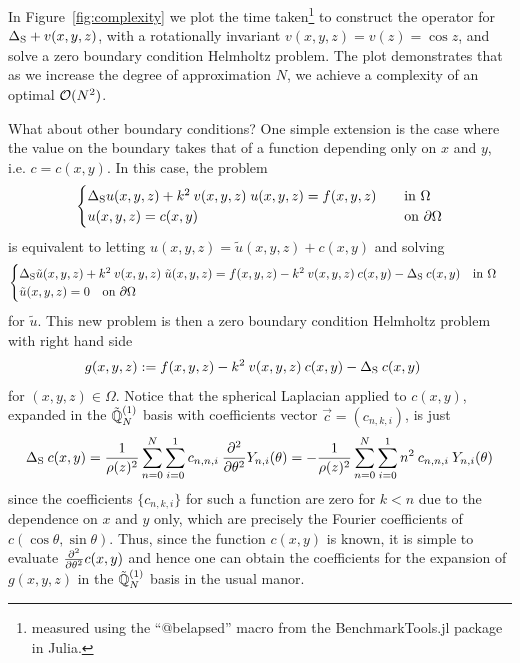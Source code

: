 \documentclass[11pt, oneside]{article}   	%
\begin{document}
In Figure~\ref{fig:complexity} we plot the time taken\footnote{measured using the \enquote{@belapsed} macro from the BenchmarkTools.jl package \cite{BenchmarkTools.jl-2016} in Julia.} to construct the operator for $\Delta_{\rm S} + v(x,y,z)$, with a rotationally invariant $v(x,y,z) = v(z) = \cos z$, and solve a zero boundary condition Helmholtz problem. The plot demonstrates that as we increase the degree of approximation $N$, we achieve a complexity of an optimal $\mathcal{O}(N^2)$.

What about other boundary conditions? One simple extension is the case where the value on the boundary takes that of a function depending only on $x$ and $y$, i.e. $c = c(x,y)$. In this case, the problem
\begin{align*}
	\begin{cases}
    		\Delta_{\rm S} u(x,y,z) + k^2 \: v(x,y,z) \; u(x,y,z) = f(x,y,z) &\quad \text{in } \Omega \\
		u(x,y,z) = c(x,y) &\quad \text{on } \partial \Omega
	\end{cases}
\end{align*}
is equivalent to letting $u(x,y,z) = \tilde{u}(x,y,z)+ c(x,y)$ and solving
\begin{align*}
	\begin{cases}
    		\Delta_{\rm S} \tilde{u}(x,y,z) + k^2 \: v(x,y,z) \; \tilde{u}(x,y,z) = f(x,y,z) - k^2 \: v(x,y,z) \: c(x,y) - \Delta_{\rm S} \: c(x,y)  \quad \text{in } \Omega \\
		\tilde{u}(x,y,z) = 0 \quad \text{on } \partial \Omega
	\end{cases}
\end{align*}
for $\tilde u$. This new problem is then a zero boundary condition Helmholtz problem with right hand side 
\begin{align*}
	g(x,y,z) &:= f(x,y,z) - k^2 \: v(x,y,z) \: c(x,y) - \Delta_{\rm S} \: c(x,y)
\end{align*}
for $(x,y,z) \in \Omega$. Notice that the spherical Laplacian applied to $c(x,y)$, expanded in the ${\mathbb{\tilde Q}}_{N}^{(1)}$ basis with coefficients vector $\vec c = (c_{n,k,i})$, is just
\begin{align*}
	\Delta_{\rm S} \: c(x,y) = {1 \over \rho(z)^2} \sum_{n=0}^N \sum_{i=0}^1 c_{n,n,i} \: {\partial^{2} \over \partial {\theta}^{2}} Y_{n,i}(\theta) = - {1 \over \rho(z)^2} \sum_{n=0}^N \sum_{i=0}^1 n^2 \: c_{n,n,i} \: Y_{n,i}(\theta)
\end{align*}
since the coefficients $\{c_{n,k,i}\}$ for such a function are zero for $k < n$ due to the dependence on $x$ and $y$ only, which are precisely the Fourier coefficients of $c(\cos \theta, \sin \theta)$. Thus, since the function $c(x,y)$ is known, it is simple to evaluate ${\partial^{2} \over \partial {\theta}^{2}} c(x,y)$ and hence one can obtain the coefficients for the expansion of $g(x,y,z)$ in the ${\mathbb{\tilde Q}}_{N}^{(1)}$ basis in the usual manor.
\end{document}
